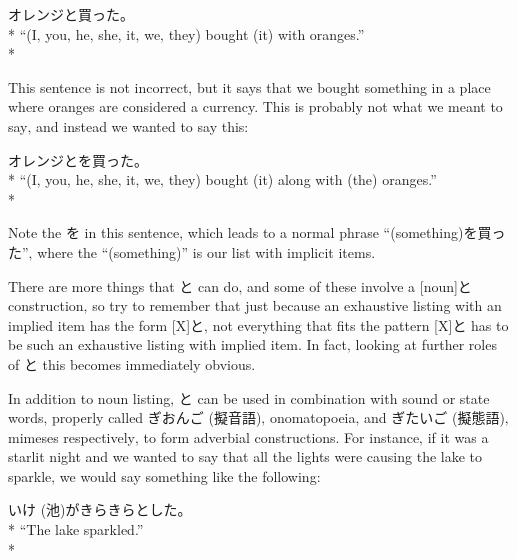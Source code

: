 \documentclass[11pt, b5paper, twoside, openright, onecolumn]{book}
\makeatletter
\newcommand*{\rubystack}[2]{{\relscale{0.5}%
  \begin{tabular}[b]{@{}c@{}}%
    {#1}\\%
   {\textscale{2}{#2}}%
  \end{tabular}}%
}
\DeclareRobustCommand*{\ruby}[2]{%
  \mbox{%
    \setlength{\parskip}{0ex}%
    \BeginAccSupp{method=pdfstringdef,ActualText={#1}}%
      \rubystack{\phantom{#2}}{#1}%
      \llap{%
        \rubystack{#2}{\phantom{#1}}%
      }%
    \EndAccSupp{}%
  }%
}
\renewcommand*{\ruby}[2]{#2 (#1)}%
\newenvironment{exampleblock}{
\setlength{\parindent}{0.6in}
\begin{minipage}[t]{\dimexpr\textwidth-\parindent}}
{\end{minipage}}
\makeatother
\begin{document}
\vspace{0.4cm}
\begin{exampleblock}
オレンジと買った。 \\* 
“(I‚ you‚ he‚ she‚ it‚ we‚ they) bought (it) with oranges.” \\* 
\end{exampleblock}
\vspace{0.2cm}

This sentence is not incorrect‚ but it says that we bought something in a place where oranges are considered a currency. This is probably not what we meant to say‚ and instead we wanted to say this:

\vspace{0.4cm}
\begin{exampleblock}
オレンジとを買った。 \\* 
“(I‚ you‚ he‚ she‚ it‚ we‚ they) bought (it) along with (the) oranges.” \\* 
\end{exampleblock}
\vspace{0.2cm}

Note the を in this sentence‚ which leads to a normal phrase “(something)を買った”‚ where the “(something)” is our list with implicit items.

There are more things that と can do‚ and some of these involve a [noun]と construction‚ so try to remember that just because an exhaustive listing with an implied item has the form [X]と‚ not everything that fits the pattern [X]と has to be such an exhaustive listing with implied item. In fact‚ looking at further roles of と this becomes immediately obvious.

In addition to noun listing‚ と can be used in combination with sound or state words‚ properly called \ruby{擬音語}{ぎおんご}‚ onomatopoeia‚ and \ruby{擬態語}{ぎたいご}‚ mimeses respectively‚ to form adverbial constructions. For instance‚ if it was a starlit night and we wanted to say that all the lights were causing the lake to sparkle‚ we would say something like the following:

\vspace{0.4cm}
\begin{exampleblock}
\ruby{池}{いけ}がきらきらとした。 \\* 
“The lake sparkled.” \\* 
\end{exampleblock}
\vspace{0.2cm}
\end{document}
